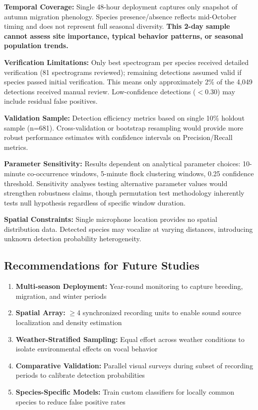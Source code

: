 \documentclass[twocolumn]{article}
\begin{document}
\textbf{Temporal Coverage:} Single 48-hour deployment captures only snapshot of autumn migration phenology. Species presence/absence reflects mid-October timing and does not represent full seasonal diversity. \textbf{This 2-day sample cannot assess site importance, typical behavior patterns, or seasonal population trends.}

\textbf{Verification Limitations:} Only best spectrogram per species received detailed verification (81 spectrograms reviewed); remaining detections assumed valid if species passed initial verification. This means only approximately 2\% of the 4,049 detections received manual review. Low-confidence detections ($<$0.30) may include residual false positives.

\textbf{Validation Sample:} Detection efficiency metrics based on single 10\% holdout sample (n=681). Cross-validation or bootstrap resampling would provide more robust performance estimates with confidence intervals on Precision/Recall metrics.

\textbf{Parameter Sensitivity:} Results dependent on analytical parameter choices: 10-minute co-occurrence windows, 5-minute flock clustering windows, 0.25 confidence threshold. Sensitivity analyses testing alternative parameter values would strengthen robustness claims, though permutation test methodology inherently tests null hypothesis regardless of specific window duration.

\textbf{Spatial Constraints:} Single microphone location provides no spatial distribution data. Detected species may vocalize at varying distances, introducing unknown detection probability heterogeneity.

\subsection{Recommendations for Future Studies}

\begin{enumerate}
\item \textbf{Multi-season Deployment:} Year-round monitoring to capture breeding, migration, and winter periods

\item \textbf{Spatial Array:} $\geq$4 synchronized recording units to enable sound source localization and density estimation

\item \textbf{Weather-Stratified Sampling:} Equal effort across weather conditions to isolate environmental effects on vocal behavior

\item \textbf{Comparative Validation:} Parallel visual surveys during subset of recording periods to calibrate detection probabilities

\item \textbf{Species-Specific Models:} Train custom classifiers for locally common species to reduce false positive rates
\end{enumerate}
\end{document}
